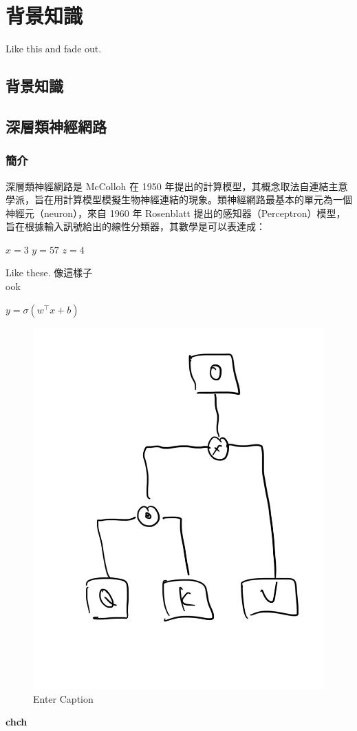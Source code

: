 \chapter{背景知識}
Like this \cite{726791, baevski2020wav2vec} and fade out.

\section{背景知識}

\section{深層類神經網路}

\subsection{簡介}

深層類神經網路是 McColloh 在 1950 年提出的計算模型，其概念取法自連結主意學派，旨在用計算模型模擬生物神經連結的現象。類神經網路最基本的單元為一個神經元（neuron），來自 1960 年 Rosenblatt 提出的感知器（Perceptron）模型，旨在根據輸入訊號給出的線性分類器，其數學是可以表達成：

$ x = 3 $
\( y = 57 \)
\( z = 4 \)

Like these. 像這樣子 \\
ook

$y=\sigma(w^\top x + b) $

\begin{figure}
    \centering
    \includegraphics[width=0.5\linewidth]{figures/Yy.png}
    \caption{Enter Caption}
    \label{fig:enter-label}
\end{figure}

\textbf{chch}

